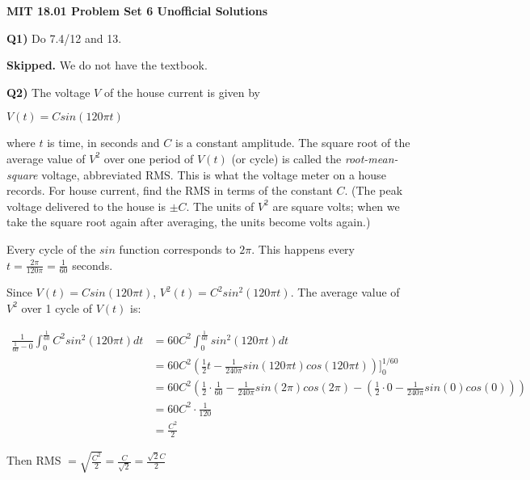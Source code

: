 \documentclass[9pt]{article}
\begin{document}
\begin{center}
  \large\textbf{MIT 18.01 Problem Set 6 Unofficial Solutions}
\end{center}

\begin{tcolorbox}
  \textbf{Q1)} Do 7.4/12 and 13.
\end{tcolorbox}

\textbf{Skipped.} We do not have the textbook.


\begin{tcolorbox}
  \textbf{Q2)} The voltage $V$ of the house current is given by\\
  \begin{center}
    $V(t) = Csin(120\pi t)$
  \end{center}
  where $t$ is time, in seconds and $C$ is a constant amplitude. The square root of the average value of $V^2$ over one period of $V(t)$ (or cycle) is called the \emph{root-mean-square} voltage, abbreviated RMS. This is what the voltage meter on a house records. For house current, find the RMS in terms of the constant $C$. (The peak voltage delivered to the house is $\pm C$. The units of $V^2$ are square volts; when we take the square root again after averaging, the units become volts again.)
\end{tcolorbox}

Every cycle of the $sin$ function corresponds to $2 \pi$. This happens every $t = \frac{2 \pi}{120 \pi} = \frac{1}{60}$ seconds.

Since $V(t) = Csin(120\pi t)$, $V^2(t) = C^2 sin^2(120\pi t)$. The average value of $V^2$ over 1 cycle of $V(t)$ is:

\begin{align*}
  \frac{1}{\frac{1}{60} - 0} \int_0^{\frac{1}{60}} C^2 sin^2(120\pi t) dt &= 60C^2 \int_0^{\frac{1}{60}} sin^2(120\pi t) dt \\
  &= 60C^2(\frac{1}{2}t - \frac{1}{240\pi} sin(120\pi t) cos(120\pi t)) \bigg]_0^{1/60} \\
  &= 60C^2(\frac{1}{2} \cdot \frac{1}{60} - \frac{1}{240\pi} sin(2\pi) cos(2\pi) - (\frac{1}{2} \cdot 0 - \frac{1}{240\pi} sin(0) cos(0))) \\
  &= 60C^2 \cdot \frac{1}{120} \\
  &= \frac{C^2}{2}
\end{align*}

Then RMS $= \sqrt{\frac{C^2}{2}} = \frac{C}{\sqrt{2}} = \frac{\sqrt{2}C}{2}$
\end{document}
